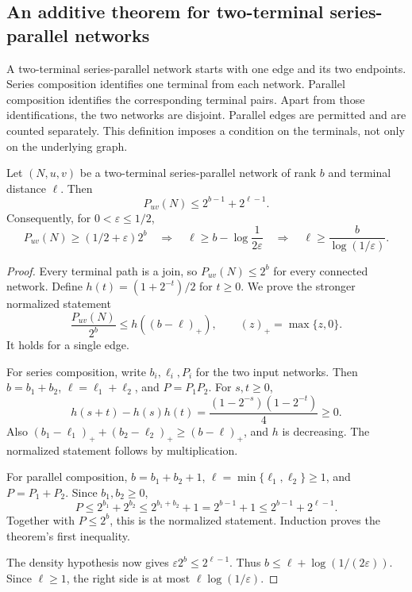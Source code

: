 \subsection{An additive theorem for two-terminal series-parallel networks}

A two-terminal series-parallel network starts with one edge and its two endpoints.
Series composition identifies one terminal from each network.
Parallel composition identifies the corresponding terminal pairs.
Apart from those identifications, the two networks are disjoint.
Parallel edges are permitted and are counted separately.
This definition imposes a condition on the terminals, not only on the underlying graph.

\begin{theorem}\label{thm:research-ttsp}
Let $(N,u,v)$ be a two-terminal series-parallel network of rank $b$ and terminal distance $\ell$.
Then
\[
 P_{uv}(N)\le 2^{b-1}+2^{\ell-1}.
\]
Consequently, for $0<\varepsilon\le1/2$,
\[
 P_{uv}(N)\ge(1/2+\varepsilon)2^b
 \quad\Longrightarrow\quad
 \ell\ge b-\log\frac1{2\varepsilon}
 \quad\Longrightarrow\quad
 \ell\ge\frac{b}{\log(1/\varepsilon)}.
\]
\end{theorem}

\begin{proof}
Every terminal path is a join, so $P_{uv}(N)\le2^b$ for every connected network.
Define $h(t)=(1+2^{-t})/2$ for $t\ge0$.
We prove the stronger normalized statement
\[
 \frac{P_{uv}(N)}{2^b}\le h((b-\ell)_+),
 \qquad (z)_+=\max\{z,0\}.
\]
It holds for a single edge.

For series composition, write $b_i,\ell_i,P_i$ for the two input networks.
Then $b=b_1+b_2$, $\ell=\ell_1+\ell_2$, and $P=P_1P_2$.
For $s,t\ge0$,
\[
 h(s+t)-h(s)h(t)=\frac{(1-2^{-s})(1-2^{-t})}{4}\ge0.
\]
Also $(b_1-\ell_1)_++(b_2-\ell_2)_+\ge(b-\ell)_+$, and $h$ is decreasing.
The normalized statement follows by multiplication.

For parallel composition, $b=b_1+b_2+1$, $\ell=\min\{\ell_1,\ell_2\}\ge1$, and $P=P_1+P_2$.
Since $b_1,b_2\ge0$,
\[
 P\le2^{b_1}+2^{b_2}
 \le2^{b_1+b_2}+1
 =2^{b-1}+1
 \le2^{b-1}+2^{\ell-1}.
\]
Together with $P\le2^b$, this is the normalized statement.
Induction proves the theorem's first inequality.

The density hypothesis now gives $\varepsilon2^b\le2^{\ell-1}$.
Thus $b\le\ell+\log(1/(2\varepsilon))$.
Since $\ell\ge1$, the right side is at most $\ell\log(1/\varepsilon)$.
\end{proof}

